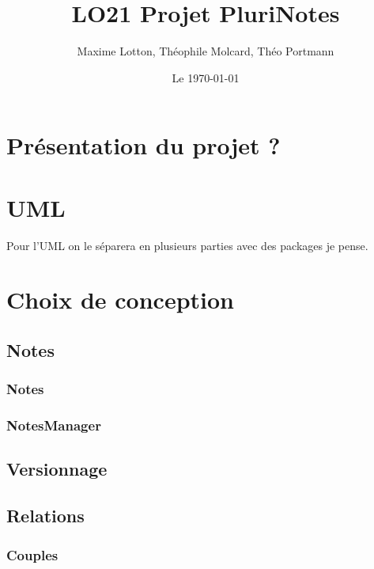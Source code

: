 \documentclass[a4paper,12pt]{report}
\begin{document}
\pagestyle{empty} %

\title{\center LO21 \center Projet  \center \textbf{PluriNotes}}
\author{Maxime Lotton, Théophile Molcard, Théo Portmann}
\date{Le \today} 
\maketitle

\pagestyle{plain}

\tableofcontents

\chapter{Présentation du projet ?}

\chapter{UML}

Pour l'UML on le séparera en plusieurs parties avec des packages je pense.



\chapter{Choix de conception}

\section{Notes}

\subsection{Notes}

\subsection{NotesManager}

\section{Versionnage}

\section{Relations}

\subsection{Couples}
\end{document}
